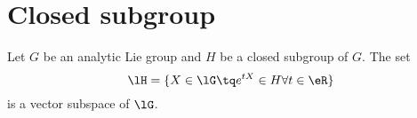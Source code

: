

\section{Closed subgroup}
\begin{lemma}     \label{LEMooFXKBooRnzZKQ}
	Let \( G\) be an analytic Lie group and \( H\) be a closed subgroup of \( G\). The set
	\begin{equation}
		\lH=\{ X\in \lG\tq  e^{tX}\in H\forall t\in \eR \}
	\end{equation}
	is a vector subspace of \( \lG\).
\end{lemma}

